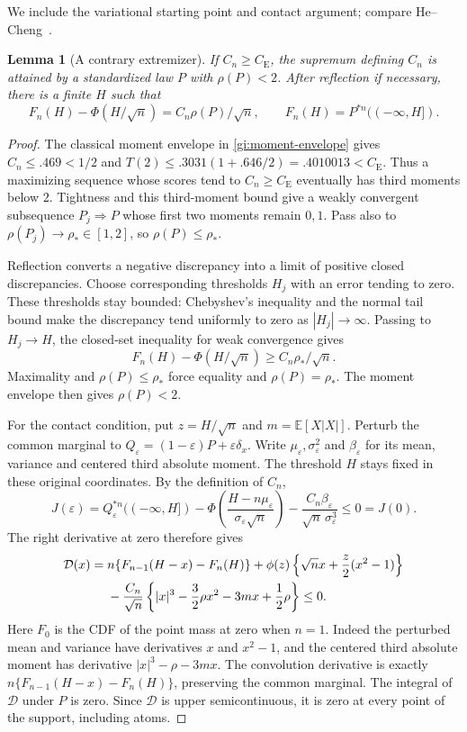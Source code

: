 \documentclass[aop,preprint]{imsart}
\newtheorem{lemma}[theorem]{Lemma}
\theoremstyle{definition}
\newcommand{\CE}{C_{\mathrm E}}
\newcommand{\E}{\mathbb E}
\numberwithin{equation}{section}
\begin{document}
We include the variational starting point and contact argument;
compare He--Cheng~\cite[Lemmas~6.1 and~6.3, equations~(12)--(15)]{HeCheng2026}.
\begin{lemma}[A contrary extremizer]\label{gi:extremizer}
If $C_n\ge\CE$, the supremum defining $C_n$ is attained by a
standardized law $P$ with $\rho(P)<2$. After reflection if necessary,
there is a finite $H$ such that
\[
 F_n(H)-\Phi(H/\sqrt n)=C_n\rho(P)/\sqrt n,
 \qquad F_n(H)=P^{*n}(( -\infty,H]).
\]
\end{lemma}
\begin{proof}
The classical moment envelope in \eqref{gi:moment-envelope} gives
$C_n\le.469<1/2$ and
$T(2)\le.3031(1+.646/2)=.4010013<\CE$.
Thus a maximizing sequence whose scores tend to $C_n\ge\CE$
eventually has third moments below $2$. Tightness and this third-moment
bound give a weakly convergent subsequence $P_j\Rightarrow P$ whose
first two moments remain $0,1$. Pass also to
$\rho(P_j)\to\rho_*\in[1,2]$, so $\rho(P)\le\rho_*$.

Reflection converts a negative discrepancy into a limit of positive
closed discrepancies. Choose corresponding thresholds $H_j$ with
an error tending to zero. These thresholds stay bounded: Chebyshev's
inequality and the normal tail bound make the discrepancy tend uniformly
to zero as $|H_j|\to\infty$. Passing to $H_j\to H$, the closed-set
inequality for weak convergence gives
\[
 F_n(H)-\Phi(H/\sqrt n)\ge C_n\rho_*/\sqrt n.
\]
Maximality and $\rho(P)\le\rho_*$ force equality and
$\rho(P)=\rho_*$. The moment envelope then gives $\rho(P)<2$.

For the contact condition, put $z=H/\sqrt n$ and $m=\E[X|X|]$.
Perturb the common marginal to
$Q_\varepsilon=(1-\varepsilon)P+\varepsilon\delta_x$.
Write $\mu_\varepsilon,\sigma_\varepsilon^2$ and
$\beta_\varepsilon$ for its mean, variance and centered third
absolute moment. The threshold $H$ stays fixed in these original
coordinates. By the definition of $C_n$,
\[
 J(\varepsilon)=Q_\varepsilon^{*n}(( -\infty,H])
 -\Phi\left(\frac{H-n\mu_\varepsilon}{\sigma_\varepsilon\sqrt n}\right)
 -\frac{C_n\beta_\varepsilon}{\sqrt n\,\sigma_\varepsilon^3}
 \le0=J(0).
\]
The right derivative at zero therefore gives
\begin{align}\label{gi:contact}
 \mathcal D(x)={}&n\{F_{n-1}(H-x)-F_n(H)\}
 +\phi(z)\left\{\sqrt n x+\frac z2(x^2-1)\right\}\notag\\
 &-\frac{C_n}{\sqrt n}
 \left\{|x|^3-\frac32\rho x^2-3mx+\frac12\rho\right\}\le0.
\end{align}
Here $F_0$ is the CDF of the point mass at zero when $n=1$.
Indeed the perturbed mean and variance have derivatives $x$ and
$x^2-1$, and the centered third absolute moment has derivative
$|x|^3-\rho-3mx$. The convolution derivative is exactly
$n\{F_{n-1}(H-x)-F_n(H)\}$, preserving the common marginal.
The integral of $\mathcal D$ under $P$ is zero.
Since $\mathcal D$ is upper semicontinuous, it is zero at every
point of the support, including atoms.

\end{proof}
\end{document}
